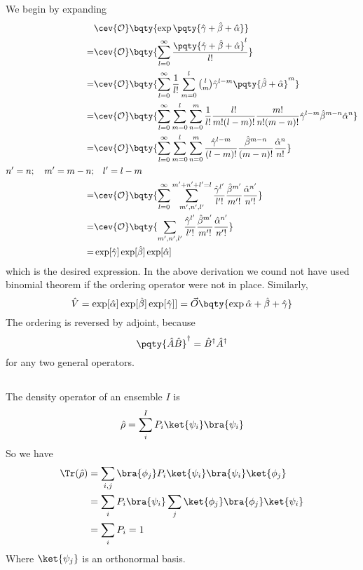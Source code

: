\documentclass[12pt]{article}
\begin{document}
\subsection{} We begin by expanding
\begin{align*}
    & \cev{\mathcal{O}}\bqty{\exp \pqty{\hat{\gamma } + \hat{\beta} + \hat{\alpha }}}\\
    =& \cev{\mathcal{O}}\bqty{\sum^\infty_{l = 0} \frac{\pqty{\hat{\gamma } + \hat{\beta} + \hat{\alpha}}^l}{l!}  }\\
    =& \cev{\mathcal{O}}\bqty{\sum^\infty_{l = 0} \frac{1}{l!} \sum_{m = 0}^l\tbinom lm \hat{\gamma }^{l - m} \pqty{\hat{\beta } + \hat{\alpha }}^{m} }\\
    =& \cev{\mathcal{O}}\bqty{\sum^\infty_{l = 0}\sum_{m = 0}^l \sum^m_{n = 0}\frac{1}{l!}\frac{l!}{m!(l - m)!} \frac{m!}{n!(m - n)!}  \hat{\gamma }^{l - m}  \hat{\beta }^{m - n} \hat{\alpha }^n}\\
    =& \cev{\mathcal{O}}\bqty{\sum^\infty_{l = 0}\sum_{m = 0}^l \sum^m_{n = 0} \frac{\hat{\gamma }^{l - m}}{(l - m)!}   \frac{\hat{\beta }^{m - n}}{(m - n)!}  \frac{\hat{\alpha }^n}{n!} } \\
    n' = n;\quad m' = m - n;&\quad l' = l - m\\
    =& \cev{\mathcal{O}}\bqty{\sum^\infty_{l = 0}\sum_{m', n', l'}^{m' + n' + l' =l} \frac{\hat{\gamma }^{l'}}{l'!}   \frac{\hat{\beta }^{m'}}{m'!}  \frac{\hat{\alpha }^{n'}}{n'!} } \\
    =& \cev{\mathcal{O}}\bqty{\sum_{m', n', l'}\frac{\hat{\gamma }^{l'}}{l'!}   \frac{\hat{\beta }^{m'}}{m'!}  \frac{\hat{\alpha }^{n'}}{n'!} } \\
    =& \exp[\hat{\gamma }] \exp[\hat{\beta}]\exp[\hat{\alpha} ]
\end{align*}
which is the desired expression. In the above derivation we cound not have used binomial theorem if the ordering operator were not in place. Similarly, \[
    \hat{V} =\exp[ \hat{\alpha}]\exp[\hat{\beta} ]\exp[\hat{\gamma}]] = \vec{O}\bqty{\exp{\hat{\alpha } + \hat{\beta } + \hat{\gamma }}}
\]
The ordering is reversed by adjoint, because \[
    \pqty{\hat{A}\hat{B}}^\dagger = \hat{B}^\dagger \hat{A}^\dagger
\]
for any two general operators.
\subsection{} The density operator of an ensemble \(I\) is \[
    \hat{\rho}  = \sum_{i}^{I}P_i \ket{\psi_i} \bra{\psi_i} 
\]
So we have \begin{align*}
    \Tr(\hat{\rho}) &=  \sum_{i,j}\bra{\phi_j} P_i \ket{\psi_i} \bra{\psi_i}\ket{\phi_j} \\
    &=  \sum_{i} P_i\bra{\psi_i} \sum_j\ket{\phi_j} \bra{\phi_j}\ket{\psi_i} \\
    &=  \sum_{i} P_i = 1
\end{align*}
Where \(\ket{\psi_j} \) is an orthonormal basis.
\end{document}
